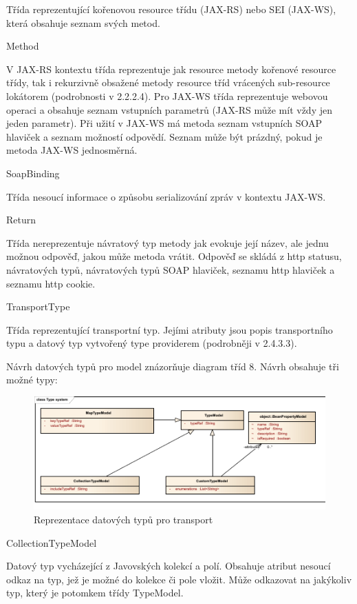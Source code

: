 \documentclass[11pt,twoside,a4paper]{book}
\begin{document}
Třída reprezentující kořenovou resource třídu (JAX-RS) nebo SEI (JAX-WS), která obsahuje
seznam svých metod.

Method

V JAX-RS kontextu třída reprezentuje jak resource metody kořenové resource třídy, tak i
rekurzivně obsažené metody resource tříd vrácených sub-resource lokátorem (podrobnosti v
2.2.2.4). Pro JAX-WS třída reprezentuje webovou operaci a obsahuje seznam vstupních
parametrů (JAX-RS může mít vždy jen jeden parametr). Při užití v JAX-WS má metoda
seznam vstupních SOAP hlaviček a seznam možností odpovědí. Seznam může být prázdný,
pokud je metoda JAX-WS jednosměrná.

SoapBinding

Třída nesoucí informace o způsobu serializování zpráv v kontextu JAX-WS.

Return

Třída nereprezentuje návratový typ metody jak evokuje její název, ale jednu možnou
odpověď, jakou může metoda vrátit. Odpověď se skládá z http statusu, návratových typů,
návratových typů SOAP hlaviček, seznamu http hlaviček a seznamu http cookie.

TransportType

Třída reprezentující transportní typ. Jejími atributy jsou popis transportního typu a datový typ
vytvořený type providerem (podrobněji v 2.4.3.3).

Návrh datových typů pro model znázorňuje diagram tříd 8. Návrh obsahuje tři možné typy:

\begin{figure}[h]
\begin{center}
\includegraphics[width=13cm]{images-pdf/Type-System.pdf}
\caption{Reprezentace datových typů pro transport}
\label{fig:logo}
\end{center}
\end{figure}

CollectionTypeModel

Datový typ vycházející z Javovských kolekcí a polí. Obsahuje atribut nesoucí odkaz na typ,
jež je možné do kolekce či pole vložit. Může odkazovat na jakýkoliv typ, který je potomkem
třídy TypeModel.
\end{document}
